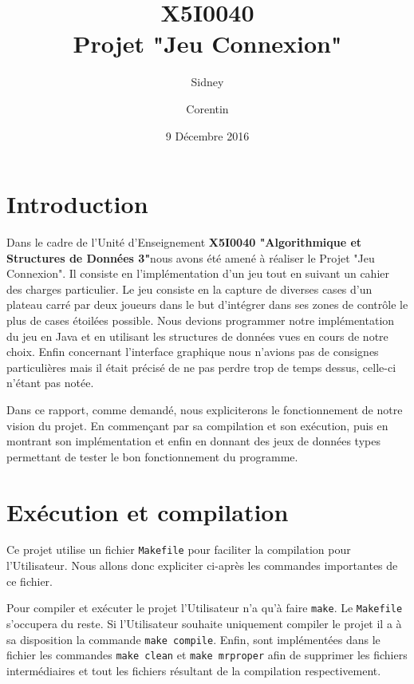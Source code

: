 \documentclass{article}
\title{X5I0040\\ Projet "Jeu Connexion"}
\author{Sidney \bsc{Falhun} \and Corentin \bsc{Chédotal}}
\date{9 Décembre 2016}
\newcommand{\info}{\texttt}
\newcommand{\ue}{\textbf{X5I0040 "Algorithmique et Structures de Données 3"}}
\begin{document}
\maketitle

\vspace{4cm} %

\tableofcontents

\newpage

\section{Introduction}

    Dans le cadre de l'Unité d'Enseignement \ue nous avons été amené à réaliser le Projet "Jeu Connexion". Il consiste en l'implémentation d'un jeu tout en suivant un cahier des charges particulier. Le jeu consiste en la capture de diverses cases d'un plateau carré par deux joueurs dans le but d'intégrer dans ses zones de contrôle le plus de cases étoilées possible. Nous devions programmer notre implémentation du jeu en Java et en utilisant les structures de données vues en cours de notre choix. Enfin concernant l'interface graphique nous n'avions pas de consignes particulières mais il était précisé de ne pas perdre trop de temps dessus, celle-ci n'étant pas notée.
    
    Dans ce rapport, comme demandé, nous expliciterons le fonctionnement de notre vision du projet. En commençant par sa compilation et son exécution, puis en montrant son implémentation et enfin en donnant des jeux de données types permettant de tester le bon fonctionnement du programme.

\section{Exécution et compilation}

    Ce projet utilise un fichier \info{Makefile} pour faciliter la compilation pour l'Utilisateur. Nous allons donc expliciter ci-après les commandes importantes de ce fichier.

    Pour compiler et exécuter le projet l'Utilisateur n'a qu'à faire \info{make}. Le \info{Makefile} s'occupera du reste. Si l'Utilisateur souhaite uniquement compiler le projet il a à sa disposition la commande \info{make compile}. Enfin, sont implémentées dans le fichier les commandes \info{make clean} et \info{make mrproper} afin de supprimer les fichiers intermédiaires et tout les fichiers résultant de la compilation respectivement.  
\end{document}
